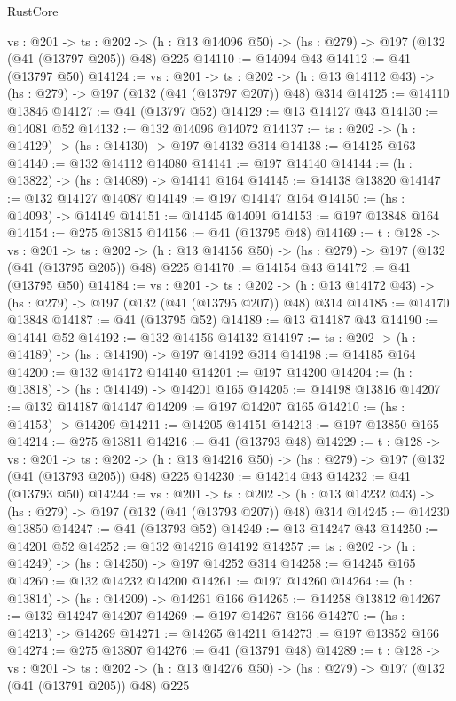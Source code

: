 \begin{lexlean}{RustCore}
\begin{coremodule}
  {vs : @201} ->
  {ts : @202} -> (h : @13 @14096 @50) -> (hs : @279) -> @197 (@132 (@41 (@13797 @205)) @48) @225
@14110 := @14094 @43
@14112 := @41 (@13797 @50)
@14124 := {vs : @201} ->
  {ts : @202} -> (h : @13 @14112 @43) -> (hs : @279) -> @197 (@132 (@41 (@13797 @207)) @48) @314
@14125 := @14110 @13846
@14127 := @41 (@13797 @52)
@14129 := @13 @14127 @43
@14130 := @14081 @52
@14132 := @132 @14096 @14072
@14137 := {ts : @202} -> (h : @14129) -> (hs : @14130) -> @197 @14132 @314
@14138 := @14125 @163
@14140 := @132 @14112 @14080
@14141 := @197 @14140
@14144 := (h : @13822) -> (hs : @14089) -> @14141 @164
@14145 := @14138 @13820
@14147 := @132 @14127 @14087
@14149 := @197 @14147 @164
@14150 := (hs : @14093) -> @14149
@14151 := @14145 @14091
@14153 := @197 @13848 @164
@14154 := @275 @13815
@14156 := @41 (@13795 @48)
@14169 := {t : @128} ->
  {vs : @201} ->
  {ts : @202} -> (h : @13 @14156 @50) -> (hs : @279) -> @197 (@132 (@41 (@13795 @205)) @48) @225
@14170 := @14154 @43
@14172 := @41 (@13795 @50)
@14184 := {vs : @201} ->
  {ts : @202} -> (h : @13 @14172 @43) -> (hs : @279) -> @197 (@132 (@41 (@13795 @207)) @48) @314
@14185 := @14170 @13848
@14187 := @41 (@13795 @52)
@14189 := @13 @14187 @43
@14190 := @14141 @52
@14192 := @132 @14156 @14132
@14197 := {ts : @202} -> (h : @14189) -> (hs : @14190) -> @197 @14192 @314
@14198 := @14185 @164
@14200 := @132 @14172 @14140
@14201 := @197 @14200
@14204 := (h : @13818) -> (hs : @14149) -> @14201 @165
@14205 := @14198 @13816
@14207 := @132 @14187 @14147
@14209 := @197 @14207 @165
@14210 := (hs : @14153) -> @14209
@14211 := @14205 @14151
@14213 := @197 @13850 @165
@14214 := @275 @13811
@14216 := @41 (@13793 @48)
@14229 := {t : @128} ->
  {vs : @201} ->
  {ts : @202} -> (h : @13 @14216 @50) -> (hs : @279) -> @197 (@132 (@41 (@13793 @205)) @48) @225
@14230 := @14214 @43
@14232 := @41 (@13793 @50)
@14244 := {vs : @201} ->
  {ts : @202} -> (h : @13 @14232 @43) -> (hs : @279) -> @197 (@132 (@41 (@13793 @207)) @48) @314
@14245 := @14230 @13850
@14247 := @41 (@13793 @52)
@14249 := @13 @14247 @43
@14250 := @14201 @52
@14252 := @132 @14216 @14192
@14257 := {ts : @202} -> (h : @14249) -> (hs : @14250) -> @197 @14252 @314
@14258 := @14245 @165
@14260 := @132 @14232 @14200
@14261 := @197 @14260
@14264 := (h : @13814) -> (hs : @14209) -> @14261 @166
@14265 := @14258 @13812
@14267 := @132 @14247 @14207
@14269 := @197 @14267 @166
@14270 := (hs : @14213) -> @14269
@14271 := @14265 @14211
@14273 := @197 @13852 @166
@14274 := @275 @13807
@14276 := @41 (@13791 @48)
@14289 := {t : @128} ->
  {vs : @201} ->
  {ts : @202} -> (h : @13 @14276 @50) -> (hs : @279) -> @197 (@132 (@41 (@13791 @205)) @48) @225

\end{coremodule}
\end{lexlean}
